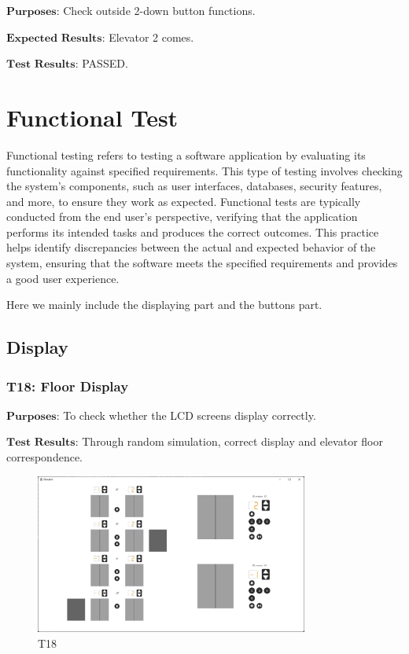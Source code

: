 \documentclass{article}
\begin{document}
$\textbf{Purposes:}$
Check outside 2-down button functions.

$\textbf{Expected Results:}$
Elevator 2 comes.

$\textbf{Test Results:}$
PASSED.

\newpage
\section{Functional Test}
Functional testing refers to testing a software application by evaluating its functionality against specified requirements. This type of testing involves checking the system's components, such as user interfaces, databases, security features, and more, to ensure they work as expected. Functional tests are typically conducted from the end user's perspective, verifying that the application performs its intended tasks and produces the correct outcomes. This practice helps identify discrepancies between the actual and expected behavior of the system, ensuring that the software meets the specified requirements and provides a good user experience.

Here we mainly include the displaying part and the buttons part.
\subsection*{Display}
\subsubsection*{T18: Floor Display}
$\textbf{Purposes:}$ To check whether the LCD screens display correctly.

$\textbf{Test Results:}$ Through random simulation, correct display and elevator floor correspondence.

\begin{figure}[htbp]
    \centering
    \includegraphics[width=0.8\textwidth]{img/T18.png}
    \caption{T18}
\end{figure}
\end{document}
